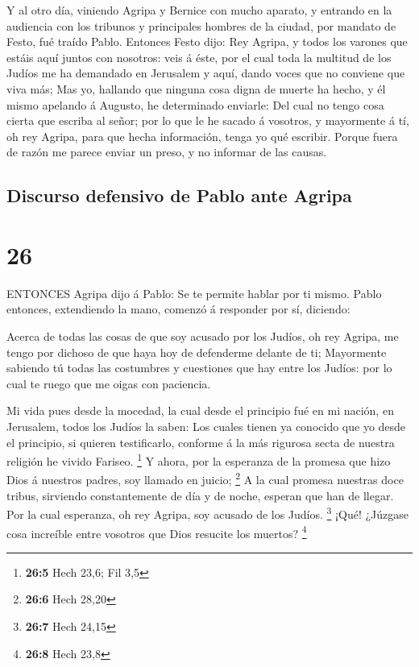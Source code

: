  Y al otro día, viniendo Agripa y Bernice con mucho
aparato, y entrando en la audiencia con los tribunos y principales
hombres de la ciudad, por mandato de Festo, fué traído Pablo.
 Entonces Festo dijo: Rey Agripa, y todos los varones que
estáis aquí juntos con nosotros: veis á éste, por el cual toda la
multitud de los Judíos me ha demandado en Jerusalem y aquí, dando voces
que no conviene que viva más;  Mas yo, hallando que ninguna
cosa digna de muerte ha hecho, y él mismo apelando á Augusto, he
determinado enviarle:  Del cual no tengo cosa cierta que
escriba al señor; por lo que le he sacado á vosotros, y mayormente á tí,
oh rey Agripa, para que hecha información, tenga yo qué escribir.
 Porque fuera de razón me parece enviar un preso, y no
informar de las causas.

\hypertarget{discurso-defensivo-de-pablo-ante-agripa}{%
\subsection{Discurso defensivo de Pablo ante
Agripa}\label{discurso-defensivo-de-pablo-ante-agripa}}

\hypertarget{section-25}{%
\section{26}\label{section-25}}

 ENTONCES Agripa dijo á Pablo: Se te permite hablar por ti
mismo. Pablo entonces, extendiendo la mano, comenzó á responder por sí,
diciendo:

 Acerca de todas las cosas de que soy acusado por los
Judíos, oh rey Agripa, me tengo por dichoso de que haya hoy de
defenderme delante de ti;  Mayormente sabiendo tú todas las
costumbres y cuestiones que hay entre los Judíos: por lo cual te ruego
que me oigas con paciencia.

 Mi vida pues desde la mocedad, la cual desde el principio
fué en mi nación, en Jerusalem, todos los Judíos la saben: 
Los cuales tienen ya conocido que yo desde el principio, si quieren
testificarlo, conforme á la más rigurosa secta de nuestra religión he
vivido Fariseo. \footnote{\textbf{26:5} Hech 23,6; Fil 3,5} 
Y ahora, por la esperanza de la promesa que hizo Dios á nuestros padres,
soy llamado en juicio; \footnote{\textbf{26:6} Hech 28,20} 
A la cual promesa nuestras doce tribus, sirviendo constantemente de día
y de noche, esperan que han de llegar. Por la cual esperanza, oh rey
Agripa, soy acusado de los Judíos. \footnote{\textbf{26:7} Hech 24,15}
 ¡Qué! ¿Júzgase cosa increíble entre vosotros que Dios
resucite los muertos? \footnote{\textbf{26:8} Hech 23,8}

